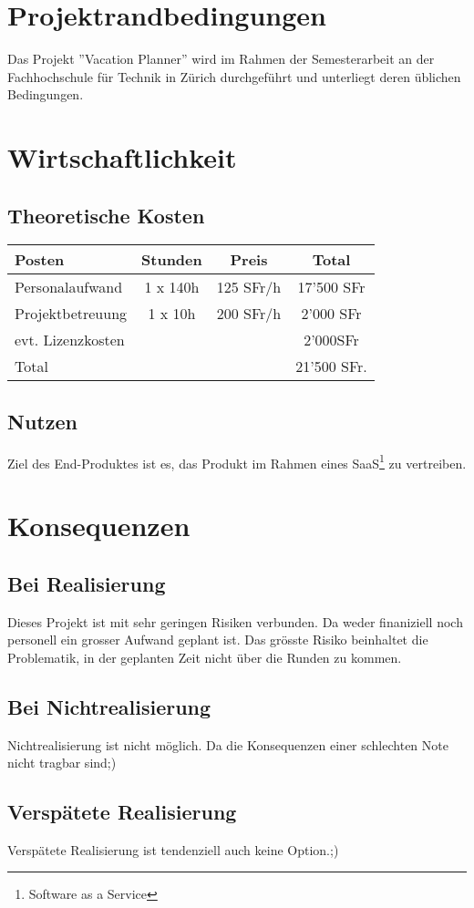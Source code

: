 \section{Projektrandbedingungen}
Das Projekt ''Vacation Planner'' wird im Rahmen der Semesterarbeit an der Fachhochschule f\"ur Technik in Z\"urich durchgef\"uhrt und unterliegt deren \"ublichen Bedingungen.

\section{Wirtschaftlichkeit}
\subsection{Theoretische Kosten}
\begin{tabular}[ht]{l|ccc}
  \hline
  Posten & Stunden & Preis & Total\\
  \hline
  Personalaufwand & 1 x 140h & 125 SFr/h &17'500 SFr \\
  Projektbetreuung & 1 x 10h & 200 SFr/h & 2'000 SFr \\
  evt. Lizenzkosten &  &  & 2'000SFr \\
  \hline
  Total & & & 21'500 SFr.\\
  \hline
\end{tabular}

\subsection{Nutzen}
Ziel des End-Produktes ist es, das Produkt im Rahmen eines SaaS\footnote{Software as a Service} zu vertreiben.
\section{Konsequenzen}
\subsection{Bei Realisierung}
Dieses Projekt ist mit sehr geringen Risiken verbunden. Da weder finaniziell noch personell ein grosser Aufwand geplant ist. Das gr\"osste Risiko beinhaltet die Problematik, in der geplanten Zeit nicht \"uber die Runden zu kommen.

\subsection{Bei Nichtrealisierung}
Nichtrealisierung ist nicht m\"oglich. Da die Konsequenzen einer schlechten Note nicht tragbar sind;)

\subsection{Versp\"atete Realisierung}
Versp\"atete Realisierung ist tendenziell auch keine Option.;)